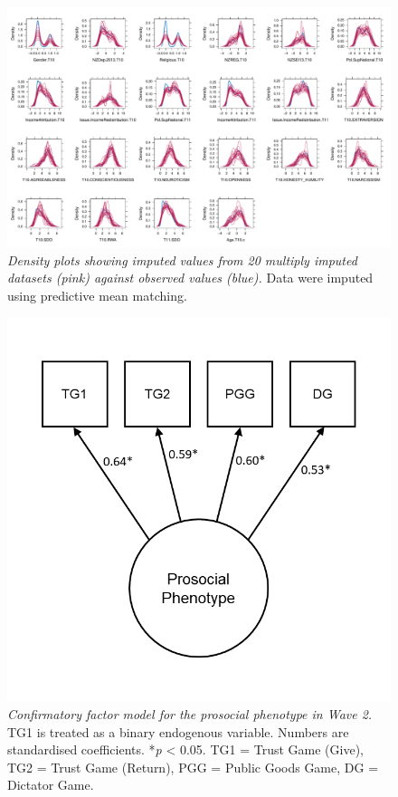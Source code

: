 \documentclass[
  man,floatsintext]{apa6}
\begin{document}
\newpage





\begin{figure}
\centering
\includegraphics{manuscript_files/figure-latex/impPlot-1.pdf}
\caption{\label{fig:impPlot}\emph{Density plots showing imputed values from 20 multiply
imputed datasets (pink) against observed values (blue).} Data were imputed
using predictive mean matching.}
\end{figure}

\newpage






\begin{figure}
\includegraphics[width=0.8\linewidth]{images/cfaReduced} \caption{\emph{Confirmatory factor model for the prosocial
phenotype in Wave 2.} TG1 is treated as a binary endogenous variable. Numbers
are standardised coefficients. *\emph{p} \textless{} 0.05. TG1 = Trust Game (Give), TG2 = Trust
Game (Return), PGG = Public Goods Game, DG = Dictator Game.}\label{fig:cfaPlotReduced}
\end{figure}
\end{document}
